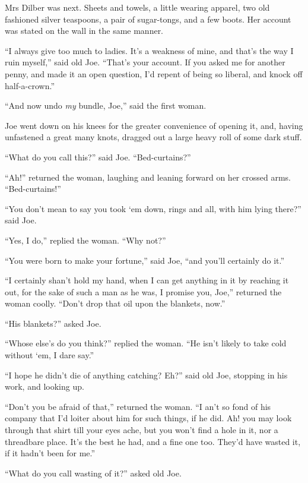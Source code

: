 \documentclass[paper=5.5in:8.5in,BCOR=7mm,twoside,DIV=calc,12pt,usegeometry]{scrbook} %
\begin{document}
Mrs Dilber was next. Sheets and towels, a little wearing apparel, two old fashioned silver teaspoons, a pair of sugar-tongs, and a few boots. Her account was stated on the wall in the same manner.

\enquote{I always give too much to ladies. It's a weakness of mine, and that's the way I ruin myself,} said old Joe. \enquote{That's your account. If you asked me for another penny, and made it an open question, I'd repent of being so liberal, and knock off half-a-crown.}

\enquote{And now undo \textit{my} bundle, Joe,} said the first woman.

Joe went down on his knees for the greater convenience of opening it, and, having unfastened a great many knots, dragged out a large heavy roll of some dark stuff.

\enquote{What do you call this?} said Joe. \enquote{Bed-curtains?}

\enquote{Ah!} returned the woman, laughing and leaning forward on her crossed arms. \enquote{Bed-curtains!}

\enquote{You don't mean to say you took `em down, rings and all, with him lying there?} said Joe.

\enquote{Yes, I do,} replied the woman. \enquote{Why not?}

\enquote{You were born to make your fortune,} said Joe, \enquote{and you'll certainly do it.}

\enquote{I certainly shan't hold my hand, when I can get anything in it by reaching it out, for the sake of such a man as he was, I promise you, Joe,} returned the woman coolly. \enquote{Don't drop that oil upon the blankets, now.}

\enquote{His blankets?} asked Joe.

\enquote{Whose else's do you think?} replied the woman. \enquote{He isn't likely to take cold without `em, I dare say.}

\enquote{I hope he didn't die of anything catching? Eh?} said old Joe, stopping in his work, and looking up.

\enquote{Don't you be afraid of that,} returned the woman. \enquote{I an't so fond of his company that I'd loiter about him for such things, if he did. Ah! you may look through that shirt till your eyes ache, but you won't find a hole in it, nor a threadbare place. It's the best he had, and a fine one too. They'd have wasted it, if it hadn't been for me.}

\enquote{What do you call wasting of it?} asked old Joe.
\end{document}
